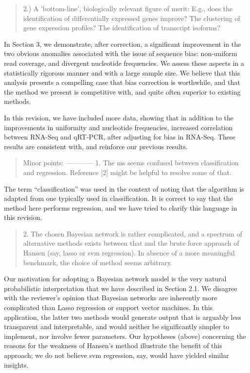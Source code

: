 \documentclass{article}
\begin{document}



\begin{quote}
2.) A 'bottom-line', biologically relevant figure of merit: E.g., does
the identification of differentially expressed genes improve? The
clustering of gene expression profiles? The identification of
transcript isoforms?
\end{quote}

In Section 3, we demonstrate, after correction, a significant improvement in
the two obvious anomalies associated with the issue of sequence bias:
non-uniform read coverage, and divergent nucleotide frequencies. We assess these
aspects in a statistically rigorous manner and with a large sample size. We
believe that this analysis presents a compelling case that bias correction is
worthwhile, and that the method we present is competitive with, and quite often
superior to existing methods.

In this revision, we have included more data, showing that in addition to the
improvements in uniformity and nucleotide frequencies, increased correlation
between RNA-Seq and qRT-PCR, after adjusting for bias in RNA-Seq. These results
are consistent with, and reinforce our previous results.


\begin{quote}
Minor points:
------------
1. The ms seems confused between classification and regression.
Reference [2] might be helpful to resolve some of that.
\end{quote}

The term ``classification'' was used in the context of noting that the algorithm
is adapted from one typically used in classification. It is correct to say that
the method here performs regression, and we have tried to clarify this language
in this revision.



\begin{quote}
2. The chosen Bayesian network is rather complicated, and a spectrum
of alternative methods exists between that and the brute force
approach of Hansen (say, lasso or svm regression). In absence of a
more meaningful benchmark, the choice of method seems arbitrary.
\end{quote}

Our motivation for adopting a Bayesian network model is the very
natural probabilistic interpretation that we have described in Section
2.1. We disagree with the reviewer's opinion that Bayesian networks
are inherently more complicated than Lasso regression or support
vector machines.  In this application, the latter two methods would
generate output that is arguably less transparent and interpretable,
and would neither be significantly simpler to implement, nor involve
fewer parameters.  Our hypotheses (above) concerning the reasons for
the weakness of Hansen's method illustrate the benefit of this
approach; we do not believe svm regression, say, would have yielded
similar insights.
\end{document}
